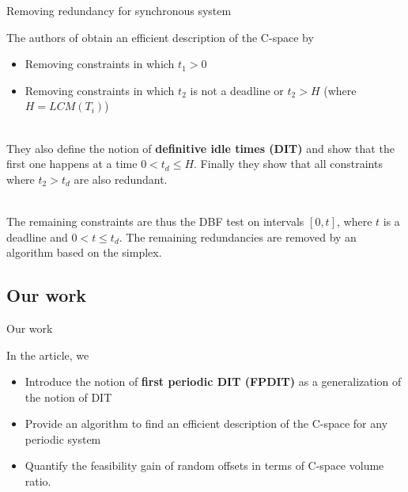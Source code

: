 \documentclass{beamer}
\begin{document}
    \begin{frame}{Removing redundancy for synchronous system}

    The authors of \cite{george2009characterization} obtain an efficient description of the C-space by
    \begin{itemize}
        \item Removing constraints in which $t_1 > 0$
        \item Removing constraints in which $t_2$ is not a deadline or $t_2 > H$ (where $H = LCM(T_i)$)
    \end{itemize}

    ~\\

    They also define the notion of \textbf{definitive idle times (DIT)} and show that the first one happens at a time $0 < t_d \leqslant H$. Finally they show that all constraints where $t_2 > t_d$ are also redundant.

    ~\\

    The remaining constraints are thus the DBF test on intervals $[0, t]$, where $t$ is a deadline and $0 < t \leqslant t_d$. The remaining redundancies are removed by an algorithm based on the simplex.

    \end{frame}




	\subsection{Our work}

	\begin{frame}{Our work}

	In the article, we
    \begin{itemize}
        \item Introduce the notion of \textbf{first periodic DIT (FPDIT)} as a generalization of the notion of DIT
        \item Provide an algorithm to find an efficient description of the C-space for any periodic system
        \item Quantify the feasibility gain of random offsets in terms of C-space volume ratio.
    \end{itemize}

	\end{frame}
\end{document}

